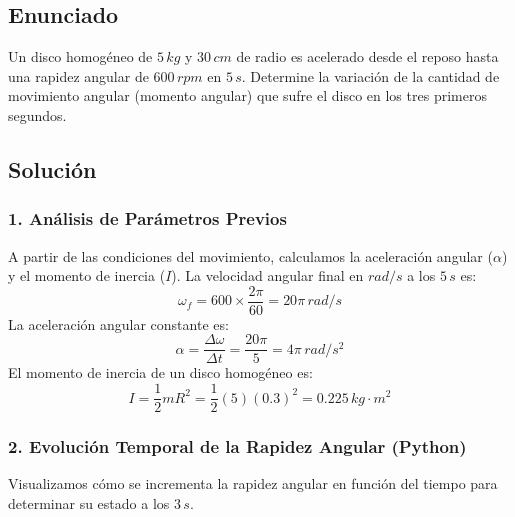\documentclass[12pt, a4paper]{article}
\begin{document}
\newpage

\subsection*{Enunciado}
Un disco homogéneo de $5 \, \si{kg}$ y $30 \, \si{cm}$ de radio es acelerado desde el reposo hasta una rapidez angular de $600 \, \si{rpm}$ en $5 \, \si{s}$. Determine la variación de la cantidad de movimiento angular (momento angular) que sufre el disco en los tres primeros segundos.

\begin{center}
\end{center}

\subsection*{Solución}

\subsubsection*{1. Análisis de Parámetros Previos}
A partir de las condiciones del movimiento, calculamos la aceleración angular ($\alpha$) y el momento de inercia ($I$).
La velocidad angular final en $\si{rad/s}$ a los $5 \, \si{s}$ es:
$$\omega_f = 600 \times \frac{2\pi}{60} = 20\pi \, \si{rad/s}$$
La aceleración angular constante es:
$$\alpha = \frac{\Delta \omega}{\Delta t} = \frac{20\pi}{5} = 4\pi \, \si{rad/s^2}$$
El momento de inercia de un disco homogéneo es:
$$I = \frac{1}{2} m R^2 = \frac{1}{2} (5) (0.3)^2 = 0.225 \, \si{kg\cdot m^2}$$

\subsubsection*{2. Evolución Temporal de la Rapidez Angular (Python)}
Visualizamos cómo se incrementa la rapidez angular en función del tiempo para determinar su estado a los $3 \, \si{s}$.
\end{document}
